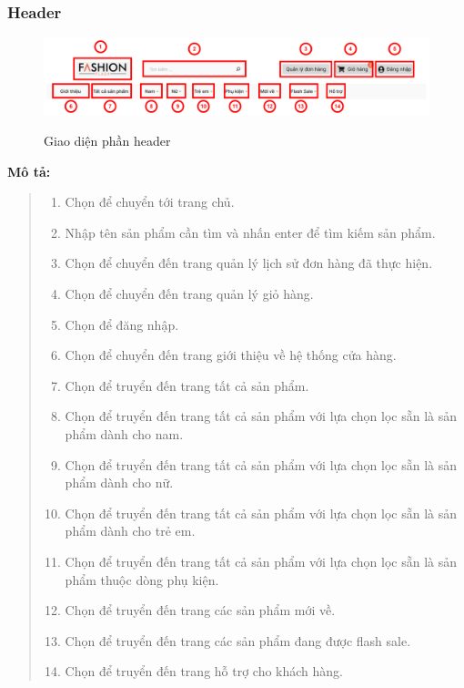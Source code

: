     \subsubsection{Header}
    \begin{figure}[!htp]
        \centering
        \includegraphics[width=5in]{img/UI/customer/header.png}
        \label{6}
        \newline
        \caption{Giao diện phần header}
    \end{figure}
    \textbf{Mô tả:}  
    \begin{quote}
        \begin{enumerate}
            \item Chọn để chuyển tới trang chủ.
            \item Nhập tên sản phẩm cần tìm và nhấn enter để tìm kiếm sản phẩm.
            \item Chọn để chuyển đến trang quản lý lịch sử đơn hàng đã thực hiện.
            \item Chọn để chuyển đến trang quản lý giỏ hàng.
            \item Chọn để đăng nhập.
            \item Chọn để chuyển đến trang giới thiệu về hệ thống cửa hàng.
            \item Chọn để truyển đến trang tất cả sản phẩm.
            \item Chọn để truyển đến trang tất cả sản phẩm với lựa chọn lọc sẵn là sản phẩm dành cho nam.
            \item Chọn để truyển đến trang tất cả sản phẩm với lựa chọn lọc sẵn là sản phẩm dành cho nữ.
            \item Chọn để truyển đến trang tất cả sản phẩm với lựa chọn lọc sẵn là sản phẩm dành cho trẻ em.
            \item Chọn để truyển đến trang tất cả sản phẩm với lựa chọn lọc sẵn là sản phẩm thuộc dòng phụ kiện.
            \item Chọn để truyển đến trang các sản phẩm mới về.
            \item Chọn để truyển đến trang các sản phẩm đang được flash sale.
            \item Chọn để truyển đến trang hỗ trợ cho khách hàng.
        \end{enumerate}
    \end{quote}
    

